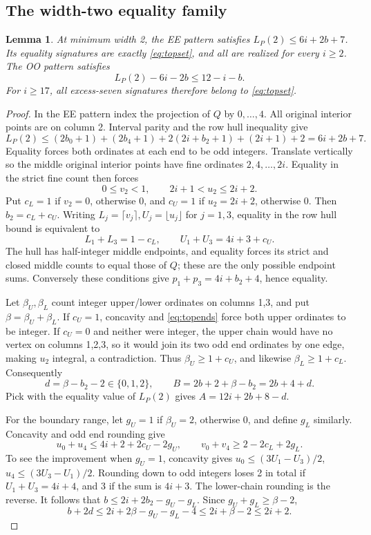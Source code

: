 \documentclass[11pt]{article}
\newtheorem{lemma}[theorem]{Lemma}
\begin{document}
\subsection{The width-two equality family}
\begin{lemma}\label{lem:top}
At minimum width 2, the EE pattern satisfies \(L_P(2)\le6i+2b+7\).
Its equality signatures are exactly \eqref{eq:topset}, and all are realized
for every \(i\ge2\). The OO pattern satisfies
\[
 L_P(2)-6i-2b\le12-i-b.
\]
For \(i\ge17\), all excess-seven signatures therefore belong to
\eqref{eq:topset}.
\end{lemma}
\begin{proof}
In the EE pattern index the projection of \(Q\) by \(0,\ldots,4\).
All original interior points are on column 2. Interval parity and the row
hull inequality give
\[
 L_P(2)\le(2b_0+1)+(2b_4+1)+2(2i+b_2+1)+(2i+1)+2
       =6i+2b+7.
\]
Equality forces both ordinates at each end to be odd integers.
Translate vertically so the middle original interior points have fine
ordinates \(2,4,\ldots,2i\). Equality in the strict fine count then forces
\[
 0\le v_2<1,\qquad 2i+1<u_2\le2i+2.
\]
Put \(c_L=1\) if \(v_2=0\), otherwise 0, and \(c_U=1\) if
\(u_2=2i+2\), otherwise 0. Then \(b_2=c_L+c_U\).
Writing \(L_j=\lceil v_j\rceil,U_j=\lfloor u_j\rfloor\) for \(j=1,3\),
equality in the row hull bound is equivalent to
\begin{equation}\label{eq:topends}
 L_1+L_3=1-c_L,\qquad U_1+U_3=4i+3+c_U.
\end{equation}
The hull has half-integer middle endpoints, and equality forces its strict
and closed middle counts to equal those of \(Q\); these are the only
possible endpoint sums. Conversely these conditions give
\(p_1+p_3=4i+b_2+4\), hence equality.

Let \(\beta_U,\beta_L\) count integer upper/lower ordinates on columns 1,3,
and put \(\beta=\beta_U+\beta_L\).
If \(c_U=1\), concavity and \eqref{eq:topends} force both upper ordinates
to be integer. If \(c_U=0\) and neither were integer, the upper chain
would have no vertex on columns 1,2,3, so it would join its two odd end
ordinates by one edge, making \(u_2\) integral, a contradiction.
Thus \(\beta_U\ge1+c_U\), and likewise \(\beta_L\ge1+c_L\).
Consequently
\[
 d=\beta-b_2-2\in\{0,1,2\},\qquad
 B=2b+2+\beta-b_2=2b+4+d.
\]
Pick with the equality value of \(L_P(2)\) gives
\(A=12i+2b+8-d\).

For the boundary range, let \(g_U=1\) if \(\beta_U=2\), otherwise 0,
and define \(g_L\) similarly. Concavity and odd end rounding give
\[
 u_0+u_4\le4i+2+2c_U-2g_U,\qquad
 v_0+v_4\ge2-2c_L+2g_L.
\]
To see the improvement when \(g_U=1\), concavity gives
\(u_0\le(3U_1-U_3)/2\), \(u_4\le(3U_3-U_1)/2\).
Rounding down to odd integers loses 2 in total if \(U_1+U_3=4i+4\),
and 3 if the sum is \(4i+3\). The lower-chain rounding is the reverse.
It follows that \(b\le2i+2b_2-g_U-g_L\).
Since \(g_U+g_L\ge\beta-2\),
\[
 b+2d\le2i+2\beta-g_U-g_L-4\le2i+\beta-2\le2i+2.
\]


\end{proof}
\end{document}
